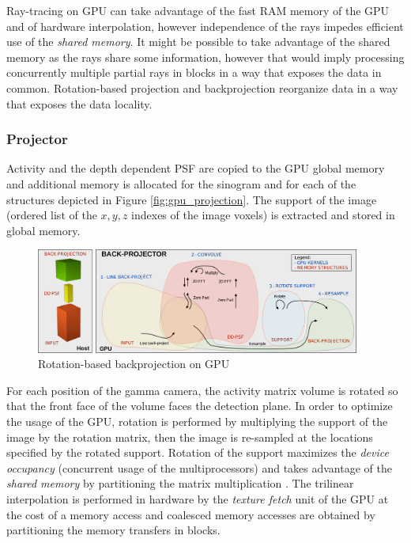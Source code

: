 \documentclass[12pt,a4paper]{report}
\begin{document}
Ray-tracing on GPU can take advantage of the fast RAM memory of the GPU and of hardware interpolation, 
however independence of the rays impedes efficient use of the \textit{shared memory}. It might be possible to 
take advantage of the shared memory as the rays share some information, however that would imply processing 
concurrently multiple partial rays in blocks in a way that exposes the data in common. 
Rotation-based projection and backprojection reorganize data in a way that exposes the data locality. \\

\vspace{3mm}
\subsubsection{Projector}
Activity and the depth dependent PSF are copied to the GPU global memory and additional memory is allocated for the sinogram and 
for each of the structures depicted in Figure \ref{fig:gpu_projection}. 
The support of the image (ordered list of the $x,y,z$ indexes of the image voxels) is extracted and stored in global memory. \\

\begin{figure}[h]
\centering
\includegraphics[width=4.2in]{gpu_4}
\caption{Rotation-based backprojection on GPU}
\label{fig:gpu_backprojection}
\end{figure}

\noindent For each position of the gamma camera, the activity matrix volume is rotated so that the front face of the volume faces the 
detection plane. In order to optimize the usage of the GPU, rotation is performed by multiplying the support of the image 
by the rotation matrix, then the image is re-sampled at the locations specified by the rotated support. Rotation of the support 
maximizes the \textit{device occupancy} (concurrent usage of the multiprocessors) and takes advantage of the \textit{shared memory} 
by partitioning the matrix multiplication \cite{cuda}. The trilinear interpolation is performed in hardware by the \textit{texture fetch} unit 
of the GPU at the cost of a memory access and coalesced memory accesses are obtained by partitioning the memory transfers in blocks.\\
 
\end{document}
